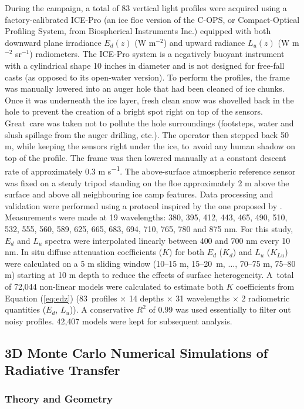 \documentclass[applsci,article,accept,moreauthors,pdftex,10pt,a4paper]{Definitions/mdpi}
\newcommand{\ked}{\ensuremath{K_{d}}}
\newcommand{\klu}{\ensuremath{K_{Lu}}}
\newcommand{\edz}{\ensuremath{{E_d(z)}}}
\newcommand{\luz}{\ensuremath{{L_u(z)}}}
\newcommand{\ed}{\ensuremath{{E_d}}}
\newcommand{\lu}{\ensuremath{{L_u}}}
\newcommand{\rsquared}{\ensuremath{R^2}}
\begin{document}
During the campaign, a total of 83 vertical light profiles were acquired using a factory-calibrated ICE-Pro (an ice floe version of the C-OPS, or Compact-Optical Profiling System, from Biospherical Instruments Inc.) equipped with both downward plane irradiance \edz{} (W m$^{-2}$) and upward radiance \luz{} (W m$^{-2}$ sr$^{-1}$) radiometers. The ICE-Pro system is a negatively buoyant instrument with a cylindrical shape 10 inches in diameter and is not designed for free-fall casts (as opposed to its open-water version). To perform the profiles, the frame was manually lowered into an auger hole that had been cleaned of ice chunks. Once it was underneath the ice layer, fresh clean snow was shovelled back in the hole to prevent the creation of a bright spot right on top of the sensors. Great~care was taken not to pollute the hole surroundings (footsteps, water and slush spillage from the auger drilling, etc.). The operator then stepped back 50 m, while keeping the sensors right under the ice, to~avoid any human shadow on top of the profile. The frame was then lowered manually at a constant descent rate of approximately 0.3 m s\textsuperscript{$-$1}. The above-surface atmospheric reference sensor was fixed on a steady tripod standing on the floe approximately 2 m above the surface and above all neighbouring ice camp features. Data processing and validation were performed using a protocol inspired by the one proposed by \citet{Smith1984}. Measurements were made at 19 wavelengths: 380, 395, 412, 443, 465, 490, 510, 532, 555, 560, 589, 625, 665, 683, 694, 710, 765, 780 and 875 nm. For this study, \ed{} and \lu{} spectra were interpolated linearly between 400 and 700 nm every 10 nm. In situ diffuse attenuation coefficients ($K$) for both \ed{} (\ked{}) and \lu{} (\klu{}) were calculated on a 5 m sliding window (10--15 m, 15--20~m, $\ldots$, 70--75 m, 75--80 m) starting at 10 m depth to reduce the effects of surface heterogeneity. A~total of 72,044 non-linear models were calculated to estimate both $K$ coefficients from  Equation (\ref{eq:edz}) (83~profiles $\times$ 14 depths $\times$ 31 wavelengths $\times$ 2 radiometric quantities (\ed{}, \lu{})). A conservative \rsquared{} of 0.99 was used essentially to filter out noisy profiles. 42,407 models were kept for subsequent analysis.

\subsection{3D Monte Carlo Numerical Simulations of Radiative Transfer}
\unskip
\subsubsection{Theory and Geometry}
\end{document}
